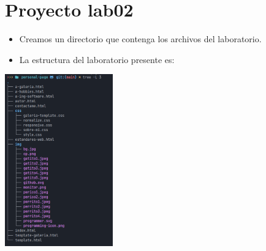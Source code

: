 \newpage %
\section{Proyecto lab02}
\begin{itemize}
  \item Creamos un directorio que contenga los archivos del laboratorio.
  \item La estructura del laboratorio presente es:
\end{itemize}
\includegraphics[width=0.35\textwidth]{img/tree.jpg}
